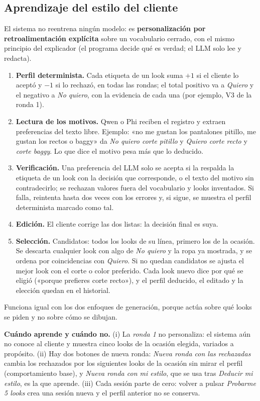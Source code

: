 \documentclass[11pt,letterpaper]{article}
\begin{document}
\subsection{Aprendizaje del estilo del cliente}
\label{sec:estilo}
El sistema no reentrena ningún modelo: es \textbf{personalización por retroalimentación explícita} sobre un
vocabulario cerrado, con el mismo principio del explicador (el programa decide qué es verdad; el LLM solo lee y redacta).
\begin{enumerate}[leftmargin=1.6em]
\item \textbf{Perfil determinista.} Cada etiqueta de un look suma $+1$ si el cliente lo aceptó y $-1$ si lo rechazó, en
todas las rondas; el total positivo va a \emph{Quiero} y el negativo a \emph{No quiero}, con la evidencia de cada una
(por ejemplo, V3 de la ronda 1).
\item \textbf{Lectura de los motivos.} Qwen o Phi reciben el registro y extraen preferencias del texto libre.
Ejemplo: «no me gustan los pantalones pitillo, me gustan los rectos o baggy» da \emph{No quiero corte pitillo} y
\emph{Quiero corte recto} y \emph{corte baggy}. Lo que dice el motivo pesa más que lo deducido.
\item \textbf{Verificación.} Una preferencia del LLM solo se acepta si la respalda la etiqueta de un look con la
decisión que corresponde, o el texto del motivo sin contradecirlo; se rechazan valores fuera del vocabulario y looks
inventados. Si falla, reintenta hasta dos veces con los errores y, si sigue, se muestra el perfil determinista marcado
como tal.
\item \textbf{Edición.} El cliente corrige las dos listas: la decisión final es suya.
\item \textbf{Selección.} Candidatos: todos los looks de su línea, primero los de la ocasión. Se descarta cualquier look
con algo de \emph{No quiero} y la ropa ya mostrada, y se ordena por coincidencias con \emph{Quiero}. Si no quedan
candidatos se ajusta el mejor look con el corte o color preferido. Cada look nuevo dice por qué se eligió («porque
prefieres corte recto»), y el perfil deducido, el editado y la elección quedan en el historial.
\end{enumerate}
Funciona igual con los dos enfoques de generación, porque actúa sobre qué looks se piden y no sobre cómo se dibujan.

\textbf{Cuándo aprende y cuándo no.} (i) La \emph{ronda 1} no personaliza: el sistema aún no conoce al cliente y muestra
cinco looks de la ocasión elegida, variados a propósito. (ii) Hay dos botones de nueva ronda: \emph{Nueva ronda con las
rechazadas} cambia los rechazados por los siguientes looks de la ocasión sin mirar el perfil (comportamiento base), y
\emph{Nueva ronda con mi estilo}, que se usa tras \emph{Deducir mi estilo}, es la que aprende. (iii) Cada sesión parte de
cero: volver a pulsar \emph{Probarme 5 looks} crea una sesión nueva y el perfil anterior no se conserva.
\end{document}
